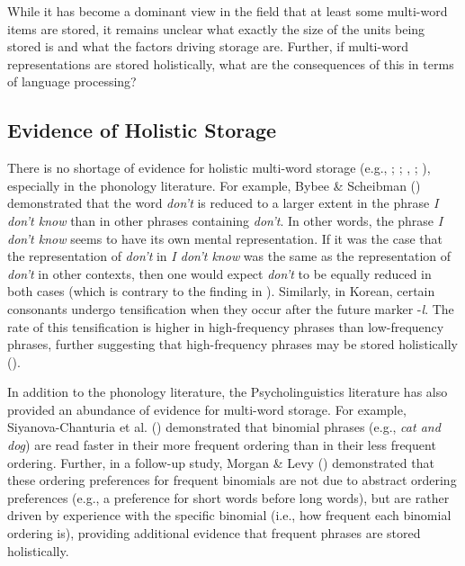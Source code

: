 \documentclass[
  12pt,
  letterpaper,
]{scrreport}
\begin{document}
While it has become a dominant view in the field that at least some
multi-word items are stored, it remains unclear what exactly the size of
the units being stored is and what the factors driving storage are.
Further, if multi-word representations are stored holistically, what are
the consequences of this in terms of language processing?

\subsection{Evidence of Holistic
Storage}\label{evidence-of-holistic-storage}

There is no shortage of evidence for holistic multi-word storage (e.g.,
;
; ,
;
), especially in the phonology literature. For example, Bybee \&
Scheibman ()
demonstrated that the word \emph{don't} is reduced to a larger extent in
the phrase \emph{I don't know} than in other phrases containing
\emph{don't}. In other words, the phrase \emph{I don't know} seems to
have its own mental representation. If it was the case that the
representation of \emph{don't} in \emph{I don't know} was the same as
the representation of \emph{don't} in other contexts, then one would
expect \emph{don't} to be equally reduced in both cases (which is
contrary to the finding in
).
Similarly, in Korean, certain consonants undergo tensification when they
occur after the future marker -\emph{l}. The rate of this tensification
is higher in high-frequency phrases than low-frequency phrases, further
suggesting that high-frequency phrases may be stored holistically
().

In addition to the phonology literature, the Psycholinguistics
literature has also provided an abundance of evidence for multi-word
storage. For example, Siyanova-Chanturia et al.
()
demonstrated that binomial phrases (e.g., \emph{cat and dog}) are read
faster in their more frequent ordering than in their less frequent
ordering. Further, in a follow-up study, Morgan \& Levy
() demonstrated
that these ordering preferences for frequent binomials are not due to
abstract ordering preferences (e.g., a preference for short words before
long words), but are rather driven by experience with the specific
binomial (i.e., how frequent each binomial ordering is), providing
additional evidence that frequent phrases are stored holistically.
\end{document}
